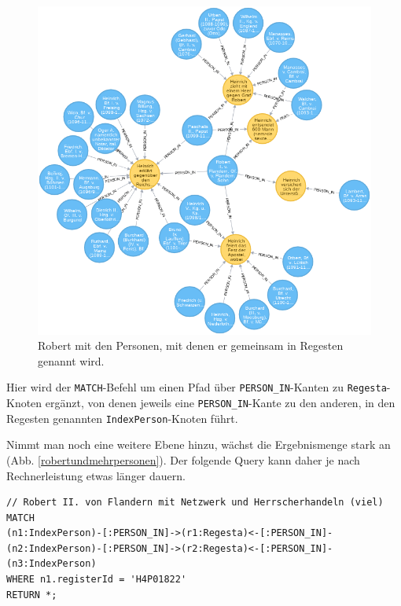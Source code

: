 \documentclass[ngerman,]{scrreprt}
\begin{document}
\begin{figure}
\centering
\includegraphics{Bilder/RI2Graph/RobertVonFlandernMitRegesten.png}
\caption{Robert mit den Personen, mit denen er gemeinsam in Regesten genannt wird.}
\label{robertundpersonen}
\end{figure}

Hier wird der \texttt{MATCH}-Befehl um einen Pfad über \texttt{PERSON\_IN}-Kanten zu \texttt{Regesta}-Knoten ergänzt, von denen jeweils eine \texttt{PERSON\_IN}-Kante zu den anderen, in den Regesten genannten \texttt{IndexPerson}-Knoten führt.

Nimmt man noch eine weitere Ebene hinzu, wächst die Ergebnismenge stark an (Abb. \ref{robertundmehrpersonen}). Der folgende Query kann daher je nach Rechnerleistung etwas länger dauern.

\begin{verbatim}
// Robert II. von Flandern mit Netzwerk und Herrscherhandeln (viel)
MATCH
(n1:IndexPerson)-[:PERSON_IN]->(r1:Regesta)<-[:PERSON_IN]-
(n2:IndexPerson)-[:PERSON_IN]->(r2:Regesta)<-[:PERSON_IN]-
(n3:IndexPerson)
WHERE n1.registerId = 'H4P01822'
RETURN *;
\end{verbatim}
\end{document}
